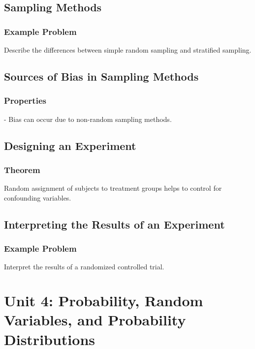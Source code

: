 \subsection{Sampling Methods}
\subsubsection{Example Problem}
\begin{example}
Describe the differences between simple random sampling and stratified sampling.
\end{example}

\subsection{Sources of Bias in Sampling Methods}
\subsubsection{Properties}
\begin{properties}
- Bias can occur due to non-random sampling methods.
\end{properties}

\subsection{Designing an Experiment}
\subsubsection{Theorem}
\begin{theorem}
Random assignment of subjects to treatment groups helps to control for confounding variables.
\end{theorem}

\subsection{Interpreting the Results of an Experiment}
\subsubsection{Example Problem}
\begin{example}
Interpret the results of a randomized controlled trial.
\end{example}

\section{Unit 4: Probability, Random Variables, and Probability Distributions}
